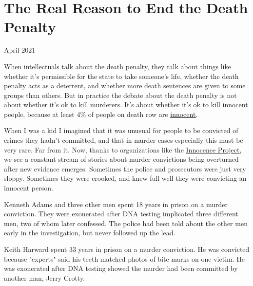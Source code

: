 \chapter{The Real Reason to End the Death Penalty}


            
              
                

April 2021

When intellectuals talk about the death
                  penalty, they talk about things like whether it's permissible
                  for the state to take someone's life, whether the death
                  penalty acts as a deterrent, and whether more death sentences
                  are given to some groups than others. But in practice the
                  debate about the death penalty is not about whether it's ok to
                  kill murderers. It's about whether it's ok to kill innocent
                  people, because at least 4\% of people on death row are
                  \href{https://www.pnas.org/content/111/20/7230}{\underline{innocent}}.

When I was a kid I imagined that it was unusual
                  for people to be convicted of crimes they hadn't committed,
                  and that in murder cases especially this must be very rare.
                  Far from it. Now, thanks to organizations like the
                  \href{https://innocenceproject.org/all-cases}{\underline{Innocence Project}}, we see a constant stream of stories about murder
                  convictions being overturned after new evidence emerges.
                  Sometimes the police and prosecutors were just very sloppy.
                  Sometimes they were crooked, and knew full well they were
                  convicting an innocent person.

Kenneth Adams and
                  three other men spent 18 years in prison on a murder
                  conviction. They were exonerated after DNA testing implicated
                  three different men, two of whom later confessed. The police
                  had been told about the other men early in the investigation,
                  but never followed up the lead.

Keith Harward spent
                  33 years in prison on a murder conviction. He was convicted
                  because "experts" said his teeth matched photos of bite marks
                  on one victim. He was exonerated after DNA testing showed the
                  murder had been committed by another man, Jerry Crotty.

